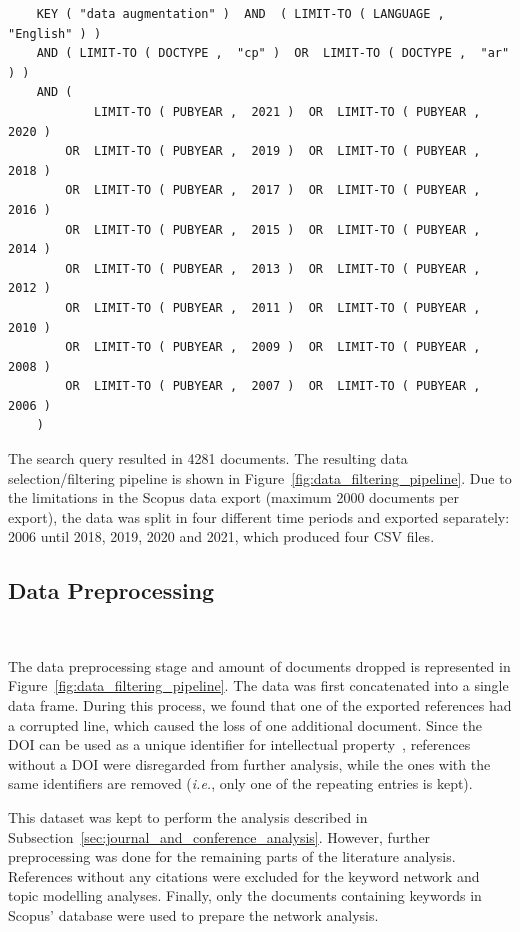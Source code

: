\documentclass[parskip=full]{scrartcl}
\begin{document}
\begin{verbatim}
    KEY ( "data augmentation" )  AND  ( LIMIT-TO ( LANGUAGE ,  "English" ) )  
    AND ( LIMIT-TO ( DOCTYPE ,  "cp" )  OR  LIMIT-TO ( DOCTYPE ,  "ar" ) )  
    AND (
            LIMIT-TO ( PUBYEAR ,  2021 )  OR  LIMIT-TO ( PUBYEAR ,  2020 )  
        OR  LIMIT-TO ( PUBYEAR ,  2019 )  OR  LIMIT-TO ( PUBYEAR ,  2018 )  
        OR  LIMIT-TO ( PUBYEAR ,  2017 )  OR  LIMIT-TO ( PUBYEAR ,  2016 )  
        OR  LIMIT-TO ( PUBYEAR ,  2015 )  OR  LIMIT-TO ( PUBYEAR ,  2014 )  
        OR  LIMIT-TO ( PUBYEAR ,  2013 )  OR  LIMIT-TO ( PUBYEAR ,  2012 )  
        OR  LIMIT-TO ( PUBYEAR ,  2011 )  OR  LIMIT-TO ( PUBYEAR ,  2010 )  
        OR  LIMIT-TO ( PUBYEAR ,  2009 )  OR  LIMIT-TO ( PUBYEAR ,  2008 )  
        OR  LIMIT-TO ( PUBYEAR ,  2007 )  OR  LIMIT-TO ( PUBYEAR ,  2006 ) 
    )  
\end{verbatim}

The search query resulted in 4281 documents. The resulting data
selection/filtering pipeline is shown in
Figure~\ref{fig:data_filtering_pipeline}. Due to the limitations in the Scopus
data export (maximum 2000 documents per export), the data was split in four
different time periods and exported separately: 2006 until 2018, 2019, 2020
and 2021, which produced four CSV files.

\subsection{Data Preprocessing}~\label{sec:data_preprocessing}

The data preprocessing stage and amount of documents dropped is represented in
Figure~\ref{fig:data_filtering_pipeline}. The data was first concatenated into
a single data frame. During this process, we found that one of the exported
references had a corrupted line, which caused the loss of one additional
document.  Since the DOI can be used as a unique identifier for intellectual
property~\cite{Paskin1999}, references without a DOI were disregarded from
further analysis, while the ones with the same identifiers are removed
(\textit{i.e.}, only one of the repeating entries is kept).

This dataset was kept to perform the analysis described in
Subsection~\ref{sec:journal_and_conference_analysis}. However, further
preprocessing was done for the remaining parts of the literature analysis.
References without any citations were excluded for the keyword network and
topic modelling analyses. Finally, only the documents containing keywords in
Scopus' database were used to prepare the network analysis.
\end{document}

